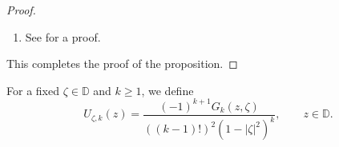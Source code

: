 \documentclass[10pt,oneside,reqno]{amsart}
\theoremstyle{definition}
\theoremstyle{remark}
\newcommand{\abs}[1]{\left\lvert #1 \right\rvert}
\renewcommand{\le}{\leqslant}
\renewcommand{\ge}{\geqslant}
\newcommand{\R}{\mathbb R}
\newcommand{\D}{\mathbb D}
\numberwithin{equation}{section}
\begin{document}
\begin{proof}
\begin{enumerate}
\begin{align*}
        &= (k-2)! \sum_{n=0}^{\infty} x^{n+k} \left[ \frac{1}{(n+1)^{\overline{k-1}}} - \frac{1}{(n+2)^{\overline{k-1}}} \right] \\
        &= (k-1)! \sum_{n=0}^{\infty} \frac{x^{n+k}}{(n+1)^{\overline{k}}}.
    \end{align*}
    This completes the proof of the claim. Now consider the function $g_{k} : \left( 0, 1 \right) \to \R$ given by $g_{k} \left( x \right) = \frac{\left( -1 \right)^{k+1}f_{k} \left( x \right)}{\left( 1- x \right)^{k}}$. Observe that from the previous claim, we have that 
    \begin{equation*}
        g_k (1-x) = (k-1)! \sum_{n=0}^{\infty} \frac{x^n}{(n+1)(n+2) \cdots (n+k)}.
    \end{equation*}
This shows that $x \mapsto g_k (x)$ is decreasing function on $(0,1)$ and  moreover we have $\lim\limits_{x\to 1^{-}}g_k (x) = \frac{1}{k}$ and $\lim\limits_{x\to 0^{+}} g_k (x) = \frac{1}{k-1}$.
 Thus, we have that 
	\begin{equation*}
	    \frac{1}{k} \left( 1-\abs{z}^{2} \right)^{k} \le \left( -1 \right)^{k+1} G_{k} \left( z, 0 \right) \le \frac{1}{k-1} \left( 1-\abs{z}^{2} \right)^{k},\qquad z\in \D\setminus \{0\}.
	\end{equation*}
The general case follows by using equation \eqref{eqn:Green-Mobius}. We omit the details. The equation \eqref{eqn:G_k-growth}
    follows from \eqref{eqn:Green-estimate} and the following estimate:     \begin{equation*}
	    \frac{1}{(1+\abs{\zeta})^2} \le \frac{1}{\abs{1-\overline{\zeta}z}^2} \le \frac{1}{(1-\abs{\zeta})^2}, \qquad  z, \zeta \in \D.
    \end{equation*}.

    \item See \cite[Lemma 3]{Begehr2002} for a proof.
\end{enumerate}
This completes the proof of the proposition.
    \end{proof}
For a fixed $\zeta \in \mathbb{D}$ and $k \ge 1$, we define  
\begin{equation}
    U_{\zeta, k}(z) =  \frac{(-1)^{k+1} G_k(z, \zeta)}{((k-1)!)^{2} (1-\abs{\zeta}^2)^{k}} , \qquad  z \in \mathbb{D}.
    \label{eqn:local-weight-in-open-disc}
\end{equation}
\end{document}
